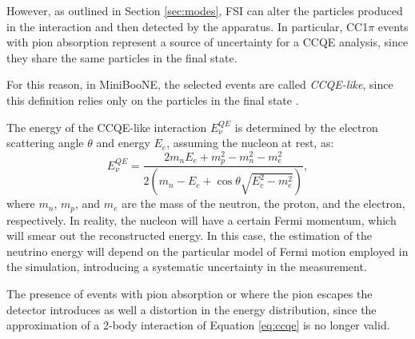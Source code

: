 However, as outlined in Section \ref{sec:modes}, FSI can alter the particles produced in the interaction and then detected by the apparatus. In particular, CC1$\pi$ events with pion absorption represent a source of uncertainty for a CCQE analysis, since they share the same particles in the final state.

For this reason, in MiniBooNE, the selected events are called \emph{CCQE-like}, since this definition relies only on the particles in the final state \cite{Katori:2013nca}. 

The energy of the CCQE-like interaction $E_{\nu}^{QE}$ is determined by the electron scattering angle $\theta$ and energy $E_e$, assuming the nucleon at rest, as:
\begin{equation}
    E_{\nu}^{QE} = \frac{2m_n E_e + m_p^2- m_n^2 - m_e^2}{2(m_n - E_e + \cos\theta\sqrt{E_e^2-m_e^2})},\label{eq:ccqe}
\end{equation}
where $m_n$, $m_p$, and $m_e$ are the mass of the neutron, the proton, and the electron, respectively. 
In reality, the nucleon will have a certain Fermi momentum, which will smear out the reconstructed energy. In this case, the estimation of the neutrino energy will depend on the particular model of Fermi motion employed in the simulation, introducing a systematic uncertainty in the measurement.

The presence of events with pion absorption or where the pion escapes the detector introduces as well a distortion in the energy distribution, since the approximation of a 2-body interaction of Equation \ref{eq:ccqe} is no longer valid.


